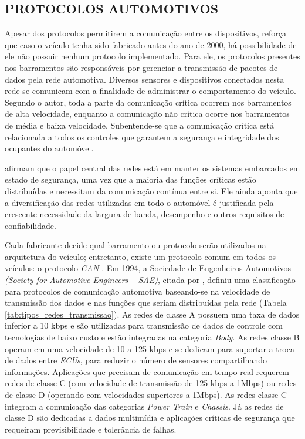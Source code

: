 \subsection{PROTOCOLOS AUTOMOTIVOS}
Apesar dos protocolos permitirem a comunicação entre os dispositivos,  reforça que caso o veículo tenha sido fabricado antes do ano de 2000, há possibilidade de ele não possuir nenhum protocolo implementado. Para ele, os protocolos presentes nos barramentos são responsáveis por gerenciar a transmissão de pacotes de dados pela rede automotiva. Diversos sensores e dispositivos conectados nesta rede se comunicam com a finalidade de administrar o comportamento do veículo. Segundo o autor, toda a parte da comunicação crítica ocorrem nos barramentos de alta velocidade, enquanto a comunicação não crítica ocorre nos barramentos de média e baixa velocidade. Subentende-se que a comunicação crítica está relacionada a todos os controles que garantem a segurança e integridade dos ocupantes do automóvel. 

 afirmam que o papel central das redes está em manter os sistemas embarcados em estado de segurança, uma vez que a maioria das funções críticas estão distribuídas e necessitam da comunicação contínua entre si. Ele ainda aponta que a diversificação das redes utilizadas em todo o automóvel é justificada pela crescente necessidade da largura de banda, desempenho e outros requisitos de confiabilidade.

Cada fabricante decide qual barramento ou protocolo serão utilizados na arquitetura do veículo; entretanto, existe um protocolo comum em todos os veículos: o protocolo \textit{CAN} \cite{smith}. Em 1994, a Sociedade de Engenheiros Automotivos \textit{(Society for Automotive Engineers – SAE)}, citada por , definiu uma classificação para protocolos de comunicação automotiva baseando-se na velocidade de transmissão dos dados e nas funções que seriam distribuídas pela rede (Tabela \ref{tab:tipos_redes_transmissao}). As redes de classe A possuem uma taxa de dados inferior a 10 kbps e são utilizadas para transmissão de dados de controle com tecnologias de baixo custo e estão integradas na categoria \textit{Body}. As redes classe B operam em uma velocidade de 10 a 125 kbps e se dedicam para suportar a troca de dados entre \textit{ECUs}, para reduzir o número de sensores compartilhando informações. Aplicações que precisam de comunicação em tempo real requerem redes de classe C (com velocidade de transmissão de 125 kbps a 1Mbps) ou redes de classe D (operando com velocidades superiores a 1Mbps). As redes classe C integram a comunicação das categorias \textit{Power Train} e \textit{Chassis}. Já as redes de classe D são dedicadas a dados multimídia e aplicações críticas de segurança que requeiram previsibilidade e tolerância de falhas.

